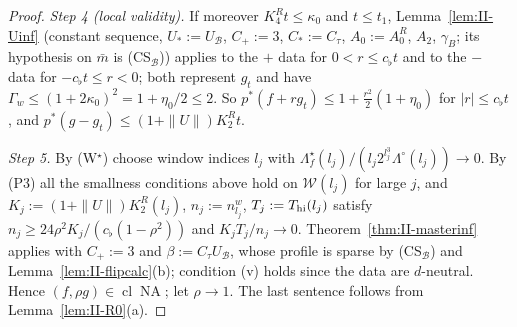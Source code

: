 \documentclass[10pt]{amsart}
\theoremstyle{definition}
\theoremstyle{remark}
\newcommand{\NA}{\operatorname{NA}}
\newcommand{\cl}{\operatorname{cl}}
\begin{document}
\begin{proof}
\emph{Step 4 (local validity).}  If moreover $K^R_4t\le\kappa_0$ and $t\le
t_1$, Lemma~\ref{lem:II-Uinf} (constant sequence, $U_*:=U_{\mathcal B}$,
$C_+:=3$, $C_*:=C_\tau$, $A_0:=A^R_0$, $A_2$, $\gamma_B$; its hypothesis on
$\bar m$ is (CS$_{\mathcal B}$)) applies to the $+$ data for $0<r\le
c_\flat t$ and to the $-$ data for $-c_\flat t\le r<0$; both represent $g_t$
and have $\Gamma_w\le(1+2\kappa_0)^2=1+\eta_0/2\le2$.  So
$p^*(f+rg_t)\le1+\frac{r^2}2(1+\eta_0)$ for $|r|\le c_\flat t$, and
$p^*(g-g_t)\le(1+\|U\|)K^R_2t$.

\emph{Step 5.}  By (W$^\star$) choose window indices $l_j$ with
$\Lambda^\star_f(l_j)/(l_j2^{l_j^3}\Lambda^\circ(l_j))\to0$.  By (P3) all the
smallness conditions above hold on $\mathcal W(l_j)$ for large $j$, and
$K_j:=(1+\|U\|)K^R_2(l_j)$, $n_j:=n^w_{l_j}$, $T_j:=T_{\rm hi}(l_j)$ satisfy
$n_j\ge24\rho^2K_j/(c_\flat(1-\rho^2))$ and $K_jT_j/n_j\to0$.
Theorem~\ref{thm:II-masterinf} applies with $C_+:=3$ and
$\beta:=C_\tau U_{\mathcal B}$, whose profile is sparse by
(CS$_{\mathcal B}$) and Lemma~\ref{lem:II-flipcalc}(b); condition (v) holds
since the data are $d$-neutral.  Hence $(f,\rho g)\in\cl\NA$; let $\rho\to1$.
The last sentence follows from Lemma~\ref{lem:II-R0}(a).
\end{proof}
\end{document}
